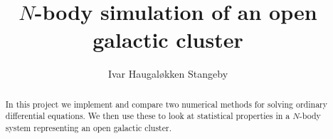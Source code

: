 \documentclass{article}
\title{$N$-body simulation of an open galactic cluster}
\author{Ivar Haugal{\o}kken Stangeby}
\begin{document}
     
    \begin{abstract}
        In this project we implement and compare two numerical methods for
        solving ordinary differential equations. We then use these to look at
        statistical properties in a $N$-body system representing an open
        galactic cluster.
    \end{abstract}
\end{document}
